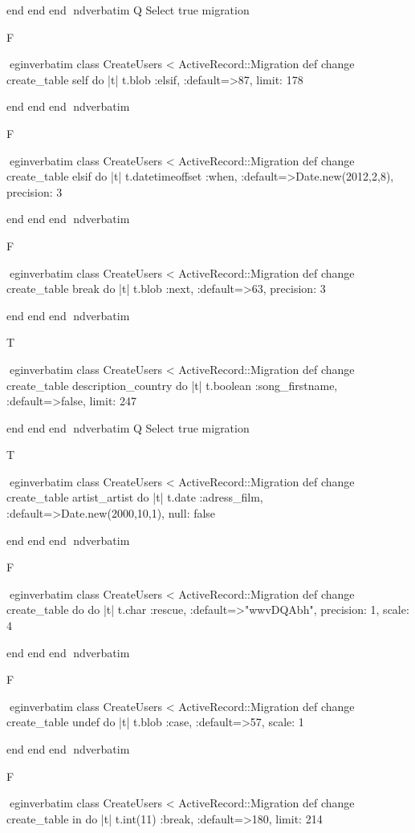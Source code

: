     end 
  end 
end
nd{verbatim}
Q
 Select true migration

F

egin{verbatim}
 class CreateUsers < ActiveRecord::Migration 
  def change 
    create_table self do |t| 
      t.blob :elsif, :default=>87, limit: 178
    
    end 
  end 
end
nd{verbatim}

F

egin{verbatim}
 class CreateUsers < ActiveRecord::Migration 
  def change 
    create_table elsif do |t| 
      t.datetimeoffset :when, :default=>Date.new(2012,2,8), precision: 3
    
    end 
  end 
end
nd{verbatim}

F

egin{verbatim}
 class CreateUsers < ActiveRecord::Migration 
  def change 
    create_table break do |t| 
      t.blob :next, :default=>63, precision: 3
    
    end 
  end 
end
nd{verbatim}

T

egin{verbatim}
 class CreateUsers < ActiveRecord::Migration 
  def change 
    create_table description_country do |t| 
      t.boolean :song_firstname, :default=>false, limit: 247
    
    end 
  end 
end
nd{verbatim}
Q
 Select true migration

T

egin{verbatim}
 class CreateUsers < ActiveRecord::Migration 
  def change 
    create_table artist_artist do |t| 
      t.date :adress_film, :default=>Date.new(2000,10,1), null: false
    
    end 
  end 
end
nd{verbatim}

F

egin{verbatim}
 class CreateUsers < ActiveRecord::Migration 
  def change 
    create_table do do |t| 
      t.char :rescue, :default=>"wwvDQAbh", precision: 1, scale: 4
    
    end 
  end 
end
nd{verbatim}

F

egin{verbatim}
 class CreateUsers < ActiveRecord::Migration 
  def change 
    create_table undef do |t| 
      t.blob :case, :default=>57, scale: 1
    
    end 
  end 
end
nd{verbatim}

F

egin{verbatim}
 class CreateUsers < ActiveRecord::Migration 
  def change 
    create_table in do |t| 
      t.int(11) :break, :default=>180, limit: 214
    
